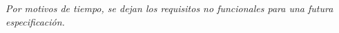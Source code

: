 \centering\textit{Por motivos de tiempo, se dejan los requisitos no funcionales para una futura especificación.}